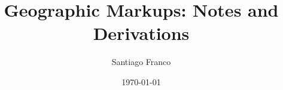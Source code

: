 


\theoremstyle{plain} \newtheorem*{assumhsa}{Assumption 1$'$}
\theoremstyle{plain} \newtheorem*{assumhiia}{Assumption 1$''$}

\title{\textbf{Geographic Markups: Notes and Derivations}}
\author{Santiago Franco}
\date{\today}

%
